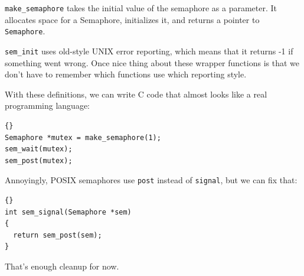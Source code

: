 \documentclass{book}
\begin{document}
{\tt make\_semaphore} takes the initial value of the semaphore
as a parameter.  It allocates space for a Semaphore, initializes
it, and returns a pointer to {\tt Semaphore}.

{\tt sem\_init} uses old-style UNIX error reporting, which means
that it returns -1 if something went wrong.  Once nice thing
about these wrapper functions is that we don't have to remember
which functions use which reporting style.

With these definitions, we can write C code that almost looks
like a real programming language:

\begin{latin}
\begin{lstlisting}[title={}]{}
Semaphore *mutex = make_semaphore(1);
sem_wait(mutex);
sem_post(mutex);
\end{lstlisting}
\end{latin}

Annoyingly, POSIX semaphores use {\tt post} instead of
{\tt signal}, but we can fix that:

\begin{latin}
\begin{lstlisting}[title={}]{}
int sem_signal(Semaphore *sem)
{
  return sem_post(sem);
}
\end{lstlisting}
\end{latin}

That's enough cleanup for now.
\end{document}
